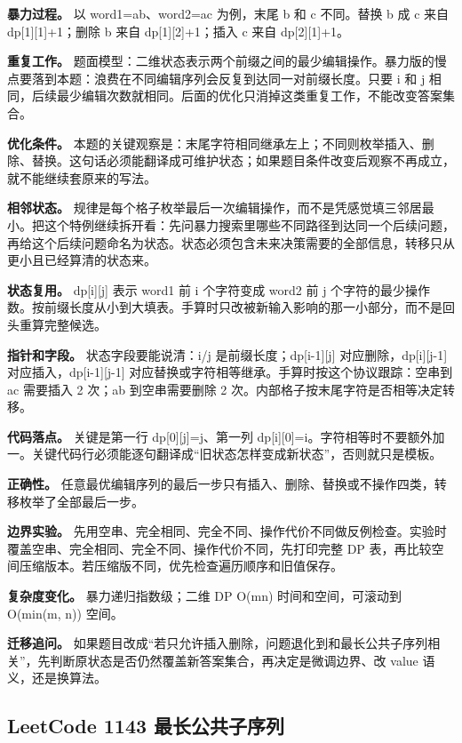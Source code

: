 \textbf{暴力过程。} 以 word1=ab、word2=ac 为例，末尾 b 和 c 不同。替换 b 成 c 来自 dp[1][1]+1；删除 b 来自 dp[1][2]+1；插入 c 来自 dp[2][1]+1。

\textbf{重复工作。} 题面模型：二维状态表示两个前缀之间的最少编辑操作。暴力版的慢点要落到本题：浪费在不同编辑序列会反复到达同一对前缀长度。只要 i 和 j 相同，后续最少编辑次数就相同。后面的优化只消掉这类重复工作，不能改变答案集合。

\textbf{优化条件。} 本题的关键观察是：末尾字符相同继承左上；不同则枚举插入、删除、替换。这句话必须能翻译成可维护状态；如果题目条件改变后观察不再成立，就不能继续套原来的写法。

\textbf{相邻状态。} 规律是每个格子枚举最后一次编辑操作，而不是凭感觉填三邻居最小。把这个特例继续拆开看：先问暴力搜索里哪些不同路径到达同一个后续问题，再给这个后续问题命名为状态。状态必须包含未来决策需要的全部信息，转移只从更小且已经算清的状态来。

\textbf{状态复用。} dp[i][j] 表示 word1 前 i 个字符变成 word2 前 j 个字符的最少操作数。按前缀长度从小到大填表。手算时只改被新输入影响的那一小部分，而不是回头重算完整候选。

\textbf{指针和字段。} 状态字段要能说清：i/j 是前缀长度；dp[i-1][j] 对应删除，dp[i][j-1] 对应插入，dp[i-1][j-1] 对应替换或字符相等继承。手算时按这个协议跟踪：空串到 ac 需要插入 2 次；ab 到空串需要删除 2 次。内部格子按末尾字符是否相等决定转移。

\textbf{代码落点。} 关键是第一行 dp[0][j]=j、第一列 dp[i][0]=i。字符相等时不要额外加一。关键代码行必须能逐句翻译成“旧状态怎样变成新状态”，否则就只是模板。

\textbf{正确性。} 任意最优编辑序列的最后一步只有插入、删除、替换或不操作四类，转移枚举了全部最后一步。

\textbf{边界实验。} 先用空串、完全相同、完全不同、操作代价不同做反例检查。实验时覆盖空串、完全相同、完全不同、操作代价不同，先打印完整 DP 表，再比较空间压缩版本。若压缩版不同，优先检查遍历顺序和旧值保存。

\textbf{复杂度变化。} 暴力递归指数级；二维 DP O(mn) 时间和空间，可滚动到 O(min(m, n)) 空间。

\textbf{迁移追问。} 如果题目改成“若只允许插入删除，问题退化到和最长公共子序列相关”，先判断原状态是否仍然覆盖新答案集合，再决定是微调边界、改 value 语义，还是换算法。

\subsection{LeetCode 1143 最长公共子序列}

